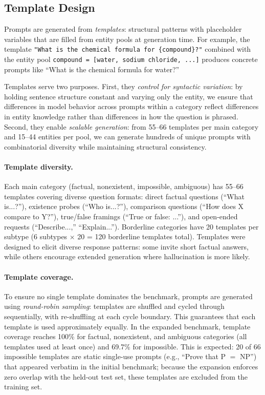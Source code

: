 \subsection{Template Design}
\label{sec:templates}

Prompts are generated from \emph{templates}: structural patterns with placeholder variables that are filled from entity pools at generation time. For example, the template \texttt{"What is the chemical formula for \{compound\}?"} combined with the entity pool \texttt{compound = [water, sodium chloride, ...]} produces concrete prompts like ``What is the chemical formula for water?''

Templates serve two purposes. First, they \emph{control for syntactic variation}: by holding sentence structure constant and varying only the entity, we ensure that differences in model behavior across prompts within a category reflect differences in entity knowledge rather than differences in how the question is phrased. Second, they enable \emph{scalable generation}: from 55--66 templates per main category and 15--44 entities per pool, we can generate hundreds of unique prompts with combinatorial diversity while maintaining structural consistency.

\paragraph{Template diversity.} Each main category (factual, nonexistent, impossible, ambiguous) has 55--66 templates covering diverse question formats: direct factual questions (``What is...?''), existence probes (``Who is...?''), comparison questions (``How does X compare to Y?''), true/false framings (``True or false: ...''), and open-ended requests (``Describe...,'' ``Explain...''). Borderline categories have 20 templates per subtype (6 subtypes $\times$ 20 = 120 borderline templates total). Templates were designed to elicit diverse response patterns: some invite short factual answers, while others encourage extended generation where hallucination is more likely.

\paragraph{Template coverage.} To ensure no single template dominates the benchmark, prompts are generated using \emph{round-robin sampling}: templates are shuffled and cycled through sequentially, with re-shuffling at each cycle boundary. This guarantees that each template is used approximately equally. In the expanded benchmark, template coverage reaches 100\% for factual, nonexistent, and ambiguous categories (all templates used at least once) and 69.7\% for impossible. This is expected: 20 of 66 impossible templates are static single-use prompts (e.g., ``Prove that P $=$ NP'') that appeared verbatim in the initial benchmark; because the expansion enforces zero overlap with the held-out test set, these templates are excluded from the training set.

